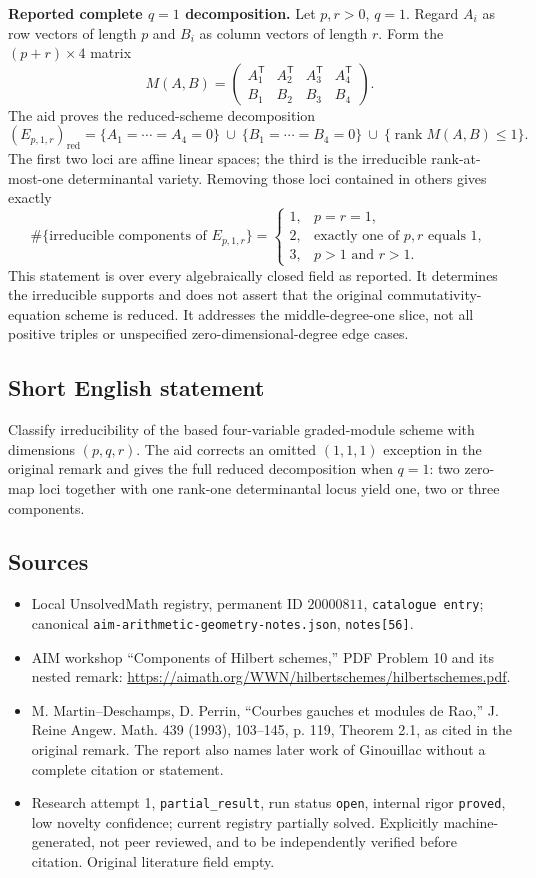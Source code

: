 \documentclass[11pt]{article}
\begin{document}
\textbf{Reported complete $q=1$ decomposition.} Let $p,r>0$, $q=1$. Regard $A_i$ as row vectors of length $p$ and $B_i$ as column vectors of length $r$. Form the $(p+r)\times4$ matrix
\[
 M(A,B)=\begin{pmatrix}A_1^{\mathsf T}&A_2^{\mathsf T}&A_3^{\mathsf T}&A_4^{\mathsf T}\\
 B_1&B_2&B_3&B_4\end{pmatrix}.
\]
The aid proves the reduced-scheme decomposition
\[
 (E_{p,1,r})_{\mathrm{red}}
 =\{A_1=\cdots=A_4=0\}\ \cup\ \{B_1=\cdots=B_4=0\}
 \ \cup\ \{\operatorname{rank}M(A,B)\leq1\}.
\]
The first two loci are affine linear spaces; the third is the irreducible rank-at-most-one determinantal variety. Removing those loci contained in others gives exactly
\[
 \#\{\text{irreducible components of }E_{p,1,r}\}
 =\begin{cases}
 1,&p=r=1,\\
 2,&\text{exactly one of }p,r\text{ equals }1,\\
 3,&p>1\text{ and }r>1.
 \end{cases}
\]
This statement is over every algebraically closed field as reported. It determines the irreducible supports and does not assert that the original commutativity-equation scheme is reduced. It addresses the middle-degree-one slice, not all positive triples or unspecified zero-dimensional-degree edge cases.
\subsection{Short English statement}
Classify irreducibility of the based four-variable graded-module scheme with dimensions $(p,q,r)$. The aid corrects an omitted $(1,1,1)$ exception in the original remark and gives the full reduced decomposition when $q=1$: two zero-map loci together with one rank-one determinantal locus yield one, two or three components.
\subsection{Sources}
\begin{itemize}
\item Local UnsolvedMath registry, permanent ID $20000811$, \texttt{catalogue entry}; canonical \texttt{aim-arithmetic-geometry-notes.json}, \texttt{notes[56]}.
\item AIM workshop ``Components of Hilbert schemes,'' PDF Problem 10 and its nested remark: \url{https://aimath.org/WWN/hilbertschemes/hilbertschemes.pdf}.
\item M. Martin--Deschamps, D. Perrin, ``Courbes gauches et modules de Rao,'' J. Reine Angew. Math. 439 (1993), 103--145, p. 119, Theorem 2.1, as cited in the original remark. The report also names later work of Ginouillac without a complete citation or statement.
\item Research attempt 1, \texttt{partial\_result}, run status \texttt{open}, internal rigor \texttt{proved}, low novelty confidence; current registry partially solved. Explicitly machine-generated, not peer reviewed, and to be independently verified before citation. Original literature field empty.
\end{itemize}
\end{document}
